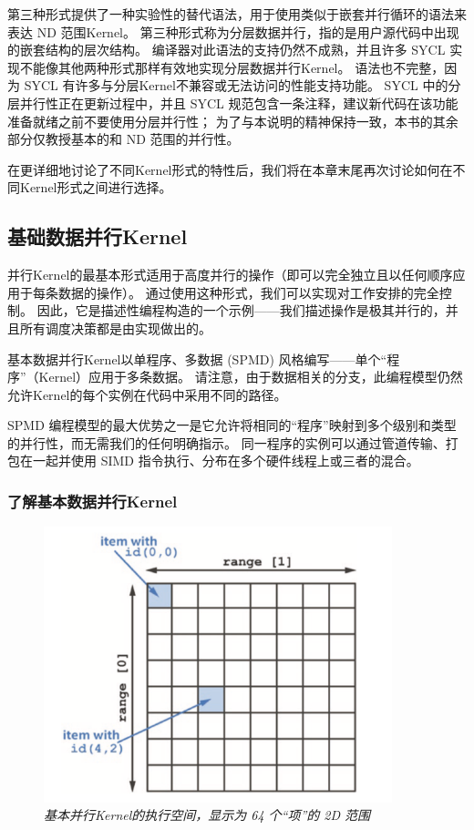 第三种形式提供了一种实验性的替代语法，用于使用类似于嵌套并行循环的语法来表达 ND 范围Kernel。 
第三种形式称为分层数据并行，指的是用户源代码中出现的嵌套结构的层次结构。 
编译器对此语法的支持仍然不成熟，并且许多 SYCL 实现不能像其他两种形式那样有效地实现分层数据并行Kernel。 
语法也不完整，因为 SYCL 有许多与分层Kernel不兼容或无法访问的性能支持功能。 
SYCL 中的分层并行性正在更新过程中，并且 SYCL 规范包含一条注释，建议新代码在该功能准备就绪之前不要使用分层并行性； 
为了与本说明的精神保持一致，本书的其余部分仅教授基本的和 ND 范围的并行性。

在更详细地讨论了不同Kernel形式的特性后，我们将在本章末尾再次讨论如何在不同Kernel形式之间进行选择。

\subsection{基础数据并行Kernel}
并行Kernel的最基本形式适用于高度并行的操作（即可以完全独立且以任何顺序应用于每条数据的操作）。 
通过使用这种形式，我们可以实现对工作安排的完全控制。 
因此，它是描述性编程构造的一个示例——我们描述操作是极其并行的，并且所有调度决策都是由实现做出的。

基本数据并行Kernel以单程序、多数据 (SPMD) 风格编写——单个“程序”（Kernel）应用于多条数据。 
请注意，由于数据相关的分支，此编程模型仍然允许Kernel的每个实例在代码中采用不同的路径。

SPMD 编程模型的最大优势之一是它允许将相同的“程序”映射到多个级别和类型的并行性，而无需我们的任何明确指示。 
同一程序的实例可以通过管道传输、打包在一起并使用 SIMD 指令执行、分布在多个硬件线程上或三者的混合。

\subsubsection{了解基本数据并行Kernel}
\begin{figure}[H]
	\centering
	\includegraphics[width=0.9\textwidth]{figs/F4.4.png}
	\caption{\textit{基本并行Kernel的执行空间，显示为 64 个“项”的 2D 范围}}
\end{figure}

